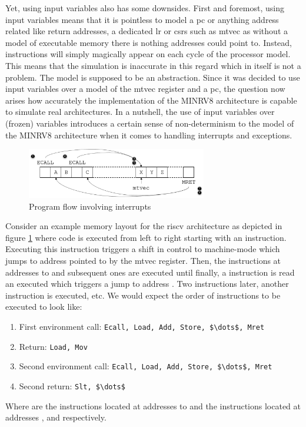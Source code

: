 Yet, using input variables also has some downsides.
First and foremost, using input variables means that it is pointless to model a \gls{pc} or anything address related like return addresses, a dedicated \gls{lr} or \glspl{csr} such as \gls{mtvec} as without a model of executable memory there is nothing addresses could point to.
Instead, instructions will simply magically appear on each cycle of the processor model.
This means that the simulation is inaccurate in this regard which in itself is not a problem.
The model is supposed to be an abstraction.
Since it was decided to use input variables over a model of the \gls{mtvec} register and a \gls{pc}, the question now arises how accurately the implementation of the MINRV8 architecture is capable to simulate real architectures.
In a nutshell, the use of input variables over (frozen) variables introduces a certain sense of non-determinism to the model of the MINRV8 architecture when it comes to handling interrupts and exceptions.

\begin{figure}
    \centering
    \includegraphics[width=0.7\textwidth]{figures/interrupt-flow.png}
    \caption{Program flow involving interrupts}
    \label{fig:interrupt-flow}
\end{figure}

Consider an example memory layout for the \gls{riscv} architecture as depicted in figure \ref{fig:interrupt-flow} where code is executed from left to right starting with an  instruction.
Executing this instruction triggers a shift in control to machine-mode which jumps to address  pointed to by the \gls{mtvec} register.
Then, the instructions at addresses  to  and subsequent ones are executed until finally, a  instruction is read an executed which triggers a jump to address .
Two instructions later, another  instruction is executed, etc.
We would expect the order of instructions to be executed to look like:

\begin{enumerate}
    \item First environment call: \lstinline[language=minrv8,mathescape=true]{Ecall, Load, Add, Store, $\dots$, Mret}
    \item Return: \lstinline[language=minrv8,mathescape=true]{Load, Mov}
    \item Second environment call: \lstinline[language=minrv8,mathescape=true]{Ecall, Load, Add, Store, $\dots$, Mret}
    \item Second return: \lstinline[language=minrv8,mathescape=true]{Slt, $\dots$}
\end{enumerate}
Where  are the instructions located at addresses  to  and  the instructions located at addresses ,  and  respectively.

